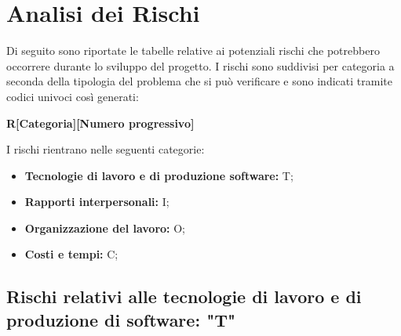 
\section{Analisi dei Rischi}
Di seguito sono riportate le tabelle relative ai potenziali rischi che potrebbero occorrere durante lo sviluppo
del progetto. I rischi sono suddivisi per categoria a seconda della tipologia del problema che si può verificare e
sono indicati tramite codici univoci così generati:

\begin{center}
    \textbf{R[Categoria][Numero progressivo]}
\end{center}

I rischi rientrano nelle seguenti categorie:
\begin{itemize}
    \item \textbf{Tecnologie di lavoro e di produzione software:} T;
    \item \textbf{Rapporti interpersonali:} I;
    \item \textbf{Organizzazione del lavoro:} O;
    \item \textbf{Costi e tempi:} C;
\end{itemize}

\subsection{Rischi relativi alle tecnologie di lavoro e di produzione di software: "T"}

